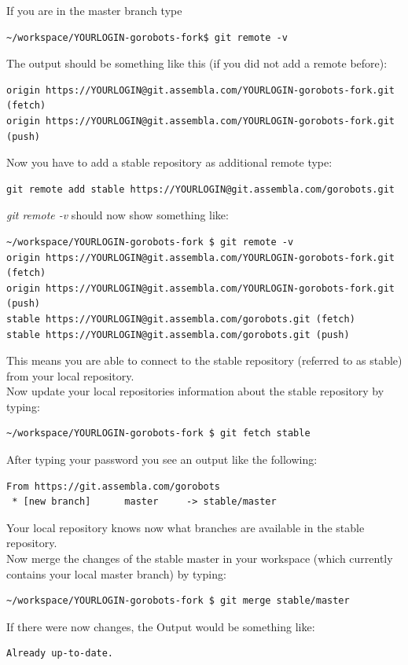 If you are in the master branch type
\begin{lstlisting}
~/workspace/YOURLOGIN-gorobots-fork$ git remote -v
\end{lstlisting}
The output should be something like this (if you did not add a remote before):
\begin{lstlisting}
origin https://YOURLOGIN@git.assembla.com/YOURLOGIN-gorobots-fork.git (fetch)
origin https://YOURLOGIN@git.assembla.com/YOURLOGIN-gorobots-fork.git (push)
\end{lstlisting}
Now you have to add a stable repository as additional remote type:
\begin{lstlisting}
git remote add stable https://YOURLOGIN@git.assembla.com/gorobots.git 
\end{lstlisting}
\emph{git remote -v} should now show something like:
\begin{lstlisting}
~/workspace/YOURLOGIN-gorobots-fork $ git remote -v
origin https://YOURLOGIN@git.assembla.com/YOURLOGIN-gorobots-fork.git (fetch)
origin https://YOURLOGIN@git.assembla.com/YOURLOGIN-gorobots-fork.git (push)
stable https://YOURLOGIN@git.assembla.com/gorobots.git (fetch)
stable https://YOURLOGIN@git.assembla.com/gorobots.git (push) 
\end{lstlisting}
This means you are able to connect to the stable repository (referred to as stable) from your local repository. \\
Now update your local repositories information about the stable repository by typing:
\begin{lstlisting}
~/workspace/YOURLOGIN-gorobots-fork $ git fetch stable  
\end{lstlisting}
After typing your password you see an output like the following:
\begin{lstlisting}
From https://git.assembla.com/gorobots
 * [new branch]      master     -> stable/master 
\end{lstlisting}
Your local repository knows now what branches are available in the stable repository.\\
Now merge the changes of the stable master in your workspace (which currently contains your local master branch) by typing:
\begin{lstlisting}
~/workspace/YOURLOGIN-gorobots-fork $ git merge stable/master 
\end{lstlisting}
If there were now changes, the Output would be something like:
\begin{lstlisting}
Already up-to-date. 
\end{lstlisting}
